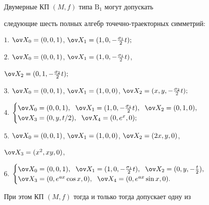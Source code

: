 \begin{thm} 


Двумерные КП $(M,f)$ типа $\mathrm B_1$ могут допускать 


следующие шесть полных алгебр точечно-траекторных симметрий$:$ 


 


$1.$ $\ov X_0=(0,0,1)$, $\ov X_1=(1,0,-\frac{\sigma_1}{2}t);$ 


 


$2.$ $\ov X_0=(0,0,1)$, $\ov X_1=(1,0,-\frac{\sigma_1}{2}t)$, 


$\ov X_2=(0,1,-\frac{\sigma_2}{2}t);$ 


 


$3.$ $\ov X_0=(0,0,1)$, $\ov X_1=(1,0,0)$, $\ov 


X_2=(x,y,-\frac{\sigma_2}{2}t);$ 


 


$4.$ $\begin{cases} 


\ov X_0=(0,0,1),\ \; \ov X_1=(1,0,-\frac{\sigma_1}{2}t), 


\ \; \ov X_2=(0,1,0),\\ 


\ov X_3=(0,y,t/2),\ \; \ov X_4=(0,e^x,0); 


\end{cases}$ 





$5.$ $\ov X_0=(0,0,1)$, $\ov X_1=(1,0,0)$, $\ov X_2=(2x,y,0)$,


$\ov X_3=(x^2,x y,0)$,


 


$6.$ $\begin{cases} 


\ov X_0=(0,0,1),\ \; \ov X_1=(1,0,-\frac{\sigma_1}{2}t), 


\ \; \ov X_2=(0,y,-\frac{t}{2}),\\ 


\ov X_3=(0,e^{a x}\cos x,0),\ \; \ov X_4= 


(0,e^{a x}\sin x,0). 


\end{cases}$ 





\noindent{}При этом КП $(M,f)$ тогда и только тогда допускает одну из 



\end{thm}
